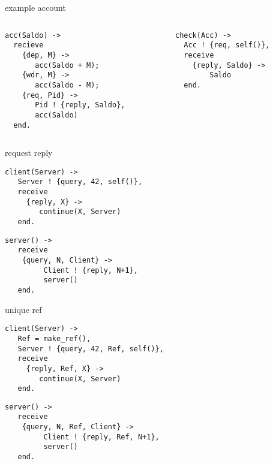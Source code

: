 \begin{frame}[fragile]{example account}

\begin{columns}
   \begin{column}{.45\linewidth}
\begin{verbatim}
acc(Saldo) ->
  recieve
    {dep, M} ->
       acc(Saldo + M);
    {wdr, M} ->
       acc(Saldo - M);
    {req, Pid} ->
       Pid ! {reply, Saldo},
       acc(Saldo)
  end.
\end{verbatim}
\end{column}
   \begin{column}{.45\linewidth}
\begin{verbatim}
check(Acc) ->
  Acc ! {req, self()},
  receive
    {reply, Saldo} ->
        Saldo
  end.
\end{verbatim}
\vfill
\end{column}
\end{columns}
\end{frame}


\begin{frame}[fragile]{request reply}

\begin{verbatim}
client(Server) ->
   Server ! {query, 42, self()},
   receive 
     {reply, X} ->
        continue(X, Server)
   end.
\end{verbatim}
\pause\vspace{10pt}
\begin{verbatim}
server() ->
   receive 
    {query, N, Client} ->
         Client ! {reply, N+1},
         server()
   end.
\end{verbatim}

\end{frame}


\begin{frame}[fragile]{unique ref}

\begin{verbatim}
client(Server) ->
   Ref = make_ref(),
   Server ! {query, 42, Ref, self()},
   receive 
     {reply, Ref, X} ->
        continue(X, Server)
   end.
\end{verbatim}
\pause\vspace{10pt}
\begin{verbatim}
server() ->
   receive 
    {query, N, Ref, Client} ->
         Client ! {reply, Ref, N+1},
         server()
   end.
\end{verbatim}

\end{frame}

